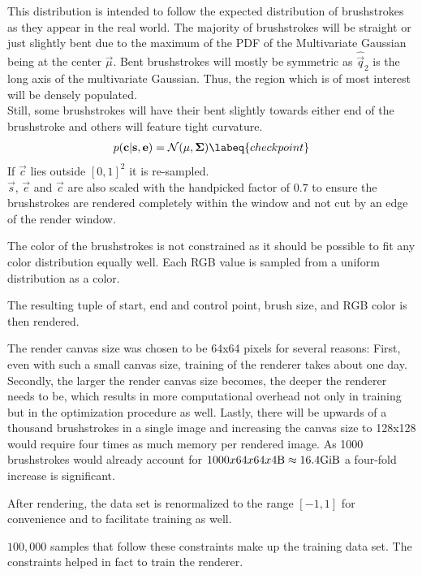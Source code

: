 This distribution is intended to follow the expected distribution of brushstrokes as they appear in the real world.
The majority of brushstrokes will be straight or just slightly bent due to the maximum of the PDF of the Multivariate Gaussian being at the center $\vec{\mu}$.
Bent brushstrokes will mostly be symmetric as $\hat{\vec{q}}_2$ is the long axis of the multivariate Gaussian.
Thus, the region which is of most interest will be densely populated.\\
Still, some brushstrokes will have their bent slightly towards either end of the brushstroke and others will feature tight curvature.
\begin{align}
    p(\vec{c}| \vec{s}, \vec{e}) & = \mathcal{N}(\vec{\mu}, \mat{\Sigma}) \labeq{checkpoint} \\
\end{align}
If $\vec{c}$ lies outside $[0, 1]^2$ it is re-sampled.\\
$\vec{s}$, $\vec{e}$ and $\vec{c}$ are also scaled with the handpicked factor of $0.7$ to ensure the brushstrokes are rendered completely within the window and not cut by an edge of the render window.

The color of the brushstrokes is not constrained as it should be possible to fit any color distribution equally well.
Each RGB value is sampled from a uniform distribution as a color.

The resulting tuple of start, end and control point, brush size, and RGB color is then rendered.

The render canvas size was chosen to be 64x64 pixels for several reasons:
First, even with such a small canvas size, training of the renderer takes about one day.
Secondly, the larger the render canvas size becomes, the deeper the renderer needs to be, which results in more computational overhead not only in training but in the optimization procedure as well.
Lastly, there will be upwards of a thousand brushstrokes in a single image and increasing the canvas size to 128x128 would require four times as much memory per rendered image.
As 1000 brushstrokes would already account for $1000 x 64 x 64 x 4 \si{\byte} \approx 16.4 \si{\gibi \byte}$ a four-fold increase is significant.

After rendering, the data set is renormalized to the range $[-1, 1]$ for convenience and to facilitate training as well.

$100,000$ samples that follow these constraints make up the training data set.
The constraints helped in fact to train the renderer.

